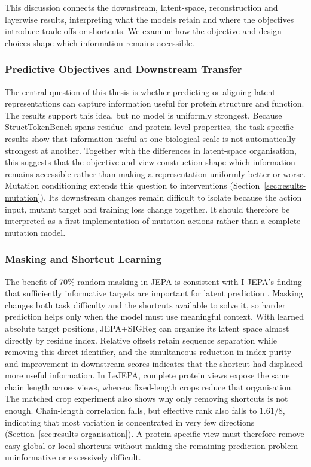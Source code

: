 This discussion connects the downstream, latent-space, reconstruction and layerwise results, interpreting what the models retain and where the objectives introduce trade-offs or shortcuts. We examine how the objective and design choices shape which information remains accessible.

\subsubsection{Predictive Objectives and Downstream Transfer}

The central question of this thesis is whether predicting or aligning latent representations can capture information useful for protein structure and function. The results support this idea, but no model is uniformly strongest. Because StructTokenBench spans residue- and protein-level properties, the task-specific results show that information useful at one biological scale is not automatically strongest at another. Together with the differences in latent-space organisation, this suggests that the objective and view construction shape which information remains accessible rather than making a representation uniformly better or worse.
Mutation conditioning extends this question to interventions (Section~\ref{sec:results-mutation}). Its downstream changes remain difficult to isolate because the action input, mutant target and training loss change together. It should therefore be interpreted as a first implementation of mutation actions rather than a complete mutation model.

\subsubsection{Masking and Shortcut Learning}

The benefit of 70\% random masking in JEPA is consistent with I-JEPA's finding that sufficiently informative targets are important for latent prediction \citep{assran2023ijepa}. Masking changes both task difficulty and the shortcuts available to solve it, so harder prediction helps only when the model must use meaningful context. With learned absolute target positions, JEPA+SIGReg can organise its latent space almost directly by residue index. Relative offsets retain sequence separation while removing this direct identifier, and the simultaneous reduction in index purity and improvement in downstream scores indicates that the shortcut had displaced more useful information. In LeJEPA, complete protein views expose the same chain length across views, whereas fixed-length crops reduce that organisation. The matched crop experiment also shows why only removing shortcuts is not enough. Chain-length correlation falls, but effective rank also falls to $1.61/8$, indicating that most variation is concentrated in very few directions (Section~\ref{sec:results-organisation}). A protein-specific view must therefore remove easy global or local shortcuts without making the remaining prediction problem uninformative or excessively difficult.

